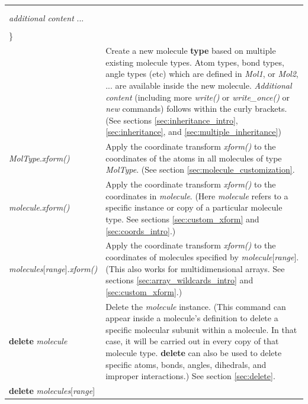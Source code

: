 \documentclass[11pt]{article}
\begin{document}
\begin{longtable}[h]{l|p{9cm}}
\\
\hline
\begin{tabular}[t]{l}
\textit{NewMol} \textbf{inherits} \textit{Mol1} \textit{Mol2} ... \{ \\
\\
\hspace{0.35cm} \textit{additional content} ... \\
\\
\} \\
\end{tabular}
&
Create a new molecule \textbf{type} based on multiple existing molecule types.
Atom types, bond types, angle types (etc) which are defined in
\textit{Mol1}, or \textit{Mol2}, ... are available inside the
new molecule.
\textit{Additional content} 
(including more \textit{write()} or \textit{write\_once()}
or \textit{new} commands)
follows within the curly brackets.
(See sections \ref{sec:inheritance_intro},
\ref{sec:inheritance}, and \ref{sec:multiple_inheritance})
\\
\hline
\textit{MolType}.\textit{xform()}
&
Apply the coordinate transform \textit{xform()} to the coordinates 
of the atoms in all molecules of type \textit{MolType}.
(See section \ref{sec:molecule_customization}.
\\
\hline
\textit{molecule}.\textit{xform()}
&
Apply the coordinate transform \textit{xform()} 
to the coordinates in \textit{molecule}.
(Here \textit{molecule} refers to a specific instance or copy of
 a particular molecule type.
See sections \ref{sec:custom_xform} and \ref{sec:coords_intro}.)
\\
\hline
\textit{molecules}[\textit{range}].\textit{xform()}
&
Apply the coordinate transform \textit{xform()} 
to the coordinates of molecules specified by
\mbox{\textit{molecule}[\textit{range}]}.
(This also works for multidimensional arrays.
See sections \ref{sec:array_wildcards_intro} and \ref{sec:custom_xform}.)
\\
\hline
\textbf{delete} \textit{molecule}
&
Delete the \textit{molecule} instance.
(This command can appear inside a molecule's definition 
 to delete a specific molecular subunit within a molecule.  In that case,
 it will be carried out in every copy of that molecule type.
 \textbf{delete} can also be used to delete specific
 atoms, bonds, angles, dihedrals, and improper interactions.)
See section \ref{sec:delete}.
\\
\hline
\textbf{delete} \textit{molecules}[\textit{range}]

\end{longtable}
\end{document}
